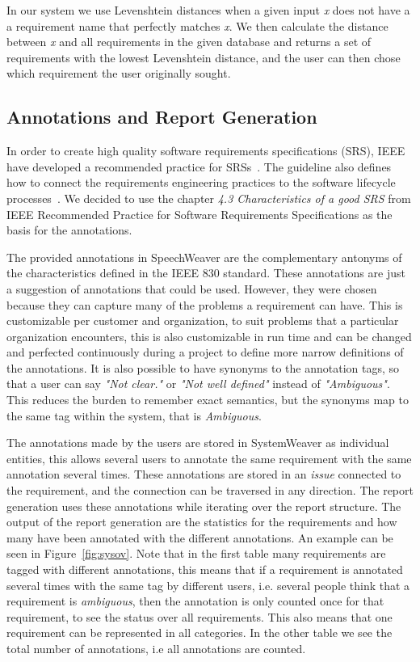 \documentclass[conference]{IEEEtran}
\begin{document}
In our system we use Levenshtein distances when a given input \emph{x} does not have a a requirement name that perfectly matches \emph{x}. 
We then calculate the distance between \emph{x} and all requirements in the given database and returns a set of requirements with the lowest Levenshtein distance, and the user can then chose which requirement the user originally sought.

\subsection{Annotations and Report Generation}
In order to create high quality software requirements specifications (SRS), IEEE have developed a recommended practice for SRSs~\cite{IEEE830}. 
The guideline also defines how to connect the requirements engineering practices to the software lifecycle processes~\cite{IEEE12207}. 
We decided to use the chapter \textit{4.3 Characteristics of a good SRS} from IEEE Recommended Practice for Software Requirements Specifications as the basis for the annotations. 

The provided annotations in SpeechWeaver are the complementary antonyms of the characteristics defined in the IEEE 830 standard. These annotations are just a suggestion of annotations that could be used.
However, they were chosen because they can capture many of the problems a requirement can have. 
This is customizable per customer and organization, to suit problems that a particular organization encounters, this is also customizable in run time and can be changed and perfected continuously during a project to define more narrow definitions of the annotations. 
It is also possible to have synonyms to the annotation tags, so that a user can say \emph{"Not clear."} or \emph{"Not well defined"} instead of \emph{"Ambiguous"}. 
This reduces the burden to remember exact semantics, but the synonyms map to the same tag within the system, that is \emph{Ambiguous}. 

The annotations made by the users are stored in SystemWeaver as individual entities, this allows several users to annotate the same requirement with the same annotation several times. These annotations are stored in an \emph{issue} connected to the requirement, and the connection can be traversed in any direction. The report generation uses these annotations while iterating over the report structure. The output of the report generation are the statistics for the requirements and how many have been annotated with the different annotations. An example can be seen in Figure~\ref{fig:sysov}. Note that in the first table many requirements are tagged with different annotations, this means that if a requirement is annotated several times with the same tag by different users, i.e. several people think that a requirement is \textit{ambiguous}, then the annotation is only counted once for that requirement, to see the status over all requirements. This also means that one requirement can be represented in all categories. In the other table we see the total number of annotations, i.e all annotations are counted.
\end{document}
